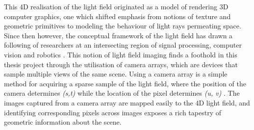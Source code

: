 \documentclass[openany]{book}
\begin{document}
This 4D realisation of the light field originated as a model of rendering 3D computer graphics, one which shifted emphasis from notions of texture and geometric primitives to modeling the behaviour of light rays permeating space. Since then however, the conceptual framework of the light field has drawn a following of researchers at an intersecting region of signal processing, computer vision and robotics \cite{dansereau2014phd}. This notion of light field imaging finds a foothold in this thesis project through the utilisation of camera arrays, which are devices that sample multiple views of the same scene. Using a camera array is a simple method for acquiring a sparse sample of the light field, where the position of the camera determines \textit{(s,t)} while the location of the pixel determines \textit{(u, v)} \cite{yao2016camarray}. The images captured from a camera array are mapped easily to the 4D light field, and identifying corresponding pixels across images exposes a rich tapestry of geometric information about the scene. 
\end{document}
